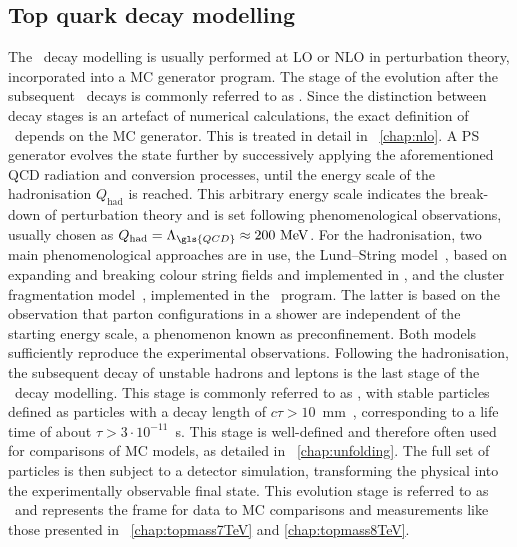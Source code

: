 \subsection{Top quark decay modelling}
%
The \ttbar\ decay modelling is usually performed at \gls{LO} or \gls{NLO} in perturbation theory, incorporated into a \gls{MC} generator program. The stage of the evolution after the subsequent \Wboson\ decays is commonly referred to as \genlevel. Since the distinction between decay stages is an artefact of numerical calculations, the exact definition of \genlevel\ depends on the \gls{MC} generator. This is treated in detail in \chap~\ref{chap:nlo}.
%
A \gls{PS} generator evolves the state further by successively applying the aforementioned \gls{QCD} radiation and conversion processes, until the energy scale of the hadronisation $Q_\mathrm{had}$ is reached. This arbitrary energy scale indicates the break-down of perturbation theory and is set following phenomenological observations, usually chosen as $Q_\mathrm{had} = \Lambda_{\gls{QCD}} \approx 200~\MeV$. For the hadronisation, two main phenomenological approaches are in use, the Lund--String model~\cite{Andersson198331,Andersson:1998tv}, based on expanding and breaking colour string fields and implemented in \Pythia, and the cluster fragmentation model~\cite{Webber:1983if}, implemented in the \Herwig\ program. The latter is based on the observation that parton configurations in a shower are independent of the starting energy scale, a phenomenon known as preconfinement. Both models sufficiently reproduce the experimental observations.
%
Following the hadronisation, the subsequent decay of unstable hadrons and leptons is the last stage of the \tquark\ decay modelling. This stage is commonly referred to as \stablevel, with stable particles defined as particles with a decay length of $c\tau>10$~mm~\cite{ATL-PHYS-PUB-2015-013}, corresponding to a life time of about $\tau>3\cdot10^{-11}$~s. 
This stage is well-defined and therefore often used for comparisons of \gls{MC} models, as detailed in \chap~\ref{chap:unfolding}. 
%
The full set of particles is then subject to a detector simulation, transforming the physical into the experimentally observable final state. This evolution stage is referred to as \recolevel\ and represents the frame for data to \gls{MC} comparisons and measurements like those presented in ~\ref{chap:topmass7TeV} and \ref{chap:topmass8TeV}.






